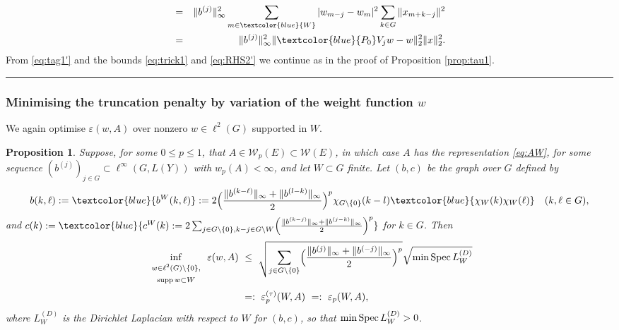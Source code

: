 \documentclass{article}
\providecommand{\blue}{\textcolor{blue}}
\newcommand\W{{\mathcal W}}
\newcommand\eps{{\varepsilon}}
\newcommand\Spec{{\rm Spec}\,}  %
\newcommand\supp{{\rm supp\,}}
\newtheorem{proposition}[theorem]{Proposition}
\newcommand\Proofend{\rule{2mm}{2mm}}
\renewenvironment{proof}
 {\par\noindent{\bf Proof.}}
 {\Proofend\par\pagebreak[2]}
\numberwithin{equation}{section}   %
\numberwithin{figure}{section}  %
\begin{document}
\begin{proof}
\begin{eqnarray}
&=& \|b^{(j)}\|_\infty^2 \sum_{m\in \textcolor{blue}{W}} |w_{m-j}-w_{m}|^2\sum_{k\in G} \|x_{m+k-j}\|^2\nonumber\\
&=& \|b^{(j)}\|_\infty^2 \|\textcolor{blue}{P_0}V_jw-w\|_2^2\|x\|_2^2.\label{eq:RHS2'}
\end{eqnarray}
%
From \eqref{eq:tag1'} and the bounds \eqref{eq:trick1} and \eqref{eq:RHS2'} we continue as in the proof of Proposition \ref{prop:tau1}.
\end{proof}
%



\subsubsection{Minimising the truncation penalty by variation of the weight function $w$}
\label{sec:min_tau}

We again optimise $\varepsilon(w,A)$ over nonzero $w\in \ell^2(G)$ supported in $W$.

\begin{proposition}
\label{prop:min_eps_tau}
Suppose, for some $0\leq p\leq 1$,  that $A\in \W_p(E)\subset \W(E)$, in which case $A$ has the representation \eqref{eq:AW},
for some sequence $(b^{(j)})_{j\in G} \subset \ell^\infty(G,L(Y))$ with $w_p(A) <\infty$, and let $W\subset G$ finite. Let $(b,c)$ be the graph over $G$ defined by
\[
b(k,\ell) := \blue{b^W(k,\ell)} := 2\Bigl(\frac{\|b^{(k-\ell)}\|_\infty + \|b^{(l-k)}\|_\infty}{2}\Bigr)^p \chi_{G\setminus\{0\}} (k-l)\blue{\chi_W(k)\chi_W(\ell)}
\quad (k,\ell\in G),
\] 
and $c(k):= \blue{c^W(k):= 2\sum_{j\in G\setminus\{0\}, k-j\in G\setminus W} \Bigl(\frac{\|b^{(k-j)}\|_\infty + \|b^{(j-k)}\|_\infty}{2}\Bigr)^p}$ for $k\in G$.
Then
\begin{align} \nonumber
\inf_{\begin{array}{c}{\scriptstyle w\in\ell^2(G)\setminus\{0\},}\\{\scriptstyle \supp w\subset W}\end{array}}\varepsilon(w,A) 
&\ \leq\ \sqrt{\sum_{j\in G\setminus\{0\}} \Bigl(\frac{\|b^{(j)}\|_\infty + \|b^{(-j)}\|_\infty}{2}\Bigr)^p} \sqrt{\min \Spec L_W^{(D)}}\\
\label{eq:Weps_tau}
&\ =:\ \eps_p^{(\tau)}(W,A)\ =:\ \eps_p(W,A),
\end{align}
where $L_W^{(D)}$ is the Dirichlet Laplacian with respect to $W$ for $(b,c)$, so that $\min \Spec L_W^{(D)}>0$.
\end{proposition}
\end{document}
